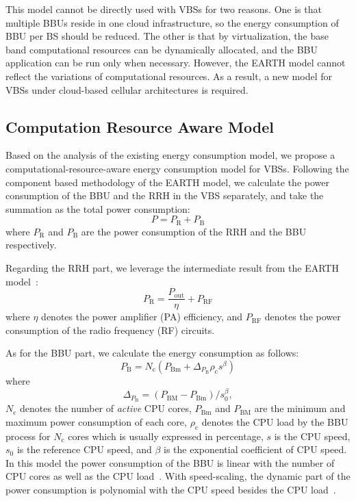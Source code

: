 \documentclass[conference]{IEEEtran}
\begin{document}
This model cannot be directly used with VBSs for two reasons.
One is that multiple BBUs reside in one cloud infrastructure,
so the energy consumption of BBU per BS should be reduced.  The
other is that by virtualization, the base band computational resources can be
dynamically allocated, and the BBU application can be run only when
necessary. However, the EARTH model cannot reflect the variations of
computational resources. As a result, a new
model for VBSs under cloud-based cellular architectures
is required.

\subsection{Computation Resource Aware Model}

Based on the analysis of the existing energy consumption model, we propose a
computational-resource-aware energy consumption model for VBSs.
Following the component based methodology of the EARTH model, we
calculate the power consumption of the BBU and the RRH in the VBS separately,
and take the summation as the total power consumption:
\begin{equation}
  P = P_\text{R} + P_\text{B}
  \label{eqn:total-power}
\end{equation}
where $P_\text{R}$ and $P_\text{B}$ are the power consumption of the RRH and the BBU respectively.

Regarding the RRH part, we leverage the intermediate
result from the EARTH model~\cite{auer2011howmuch}:
\begin{equation}
  P_\text{R} = \frac{P_\text{out}}{\eta}+P_\text{RF}
  \label{eqn:rrh-power}
\end{equation}
where $\eta$ denotes the power amplifier (PA) efficiency,
and $P_\text{RF}$ denotes the
power consumption of the radio frequency (RF) circuits.

As for the BBU part, we calculate the energy consumption as follows:
\begin{equation}
  P_\text{B} = N_\text{c}(P_\text{Bm}+ \Delta_{P_\text{B}} \rho_\text{c} s^\beta)
  \label{eqn:pbs}
\end{equation}
where
\begin{equation}
  \Delta_{P_\text{B}} = (P_\text{BM}-P_\text{Bm}) / s_0^\beta ,
  \label{eqn:Delta}
\end{equation}
$N_\text{c}$ denotes the number of \emph{active} CPU cores,
$P_\text{Bm}$ and $P_\text{BM}$ are the minimum and maximum power consumption of
each core,
$\rho_\text{c}$ denotes the CPU load by the BBU process for $N_\text{c}$
cores which is usually expressed in percentage,
$s$ is the CPU speed,
$s_0$ is the reference CPU speed,
and $\beta$ is the exponential coefficient of CPU speed.
In this model
the power consumption of the BBU is linear with the number of CPU cores as well as
the CPU load~\cite{blackburn2008five,vasan2010worth}.
With speed-scaling, the dynamic part of the power
consumption is polynomial with the CPU speed besides the CPU
load~\cite{son2012speedbalance}.
\end{document}
